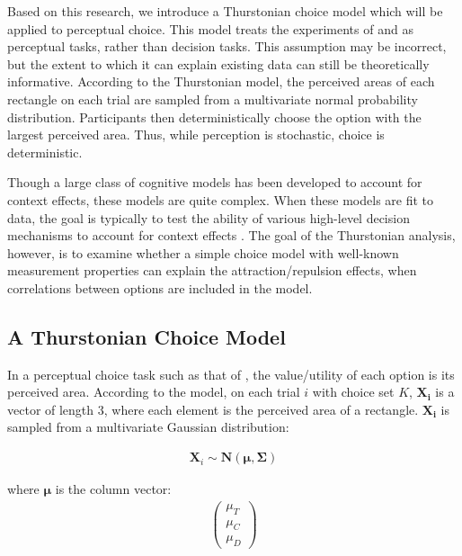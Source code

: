 Based on this research, we introduce a Thurstonian choice model which will be applied to perceptual choice. This model treats the experiments of \textcite{trueblood2013not} and \textcite{spektorWhenGoodLooks2018b} as perceptual tasks, rather than decision tasks. This assumption may be incorrect, but the extent to which it can explain existing data can still be theoretically informative. According to the Thurstonian model, the perceived areas of each rectangle on each trial are sampled from a multivariate normal probability distribution. Participants then deterministically choose the option with the largest perceived area. Thus, while perception is stochastic, choice is deterministic.

Though a large class of cognitive models has been developed to account for context effects, these models are quite complex. When these models are fit to data, the goal is typically to test the ability of various high-level decision mechanisms to account for context effects \parencite{turnerCompetingTheoriesMultialternative2018a}. The goal of the Thurstonian analysis, however, is to examine whether a simple choice model with well-known measurement properties can explain the attraction/repulsion effects, when correlations between options are included in the model. 

\subsection{A Thurstonian Choice Model}

In a perceptual choice task such as that of \textcite{spektorWhenGoodLooks2018b}, the value/utility of each option is its perceived area. According to the model, on each trial $i$ with choice set $K$, $\bm{X_i}$ is a vector of length $3$, where each element is the perceived area of a rectangle. $\bm{X_i}$ is sampled from a multivariate Gaussian distribution:

\begin{align}
   \bm{X}_{i} \sim \bm{N}(\boldsymbol{\mu}, \boldsymbol{\Sigma})
   \label{eqn:mvnorm}
\end{align}

where $\boldsymbol{\mu}$ is the column vector:
\begin{align}
   \begin{pmatrix}
      \mu_{T} \\
      \mu_{C} \\
      \mu_{D}
      \end{pmatrix}
   \label{eqn:mu}
\end{align}

